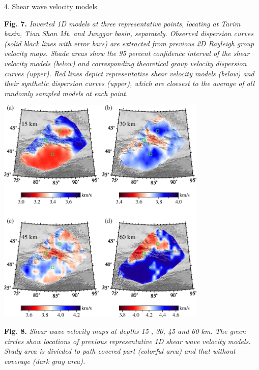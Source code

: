 \documentclass[
    landscape,      %
    paperwidth = 1120mm,
    paperheight = 820mm,
    fontscale = 0.45,
    margin = 1.7cm,
]{baposter}
\begin{document}
\begin{poster}
\begin{posterbox}[column=2 ]{4. Shear wave velocity models}
\begin{center}
\begin{minipage}{0.9\textwidth}
\small
\textbf{Fig. 7.}
\itshape
Inverted 1D models at three representative points, locating at Tarim basin, Tian Shan Mt. and Junggar basin, separately.
Observed dispersion curves (solid black lines with error bars) are extracted from previous 2D Rayleigh group velocity maps.
Shade areas show the 95 percent confidence interval of the shear velocity models (below) and corresponding theoretical
group velocity dispersion curves (upper). Red lines depict representative shear velocity models (below)
and their synthetic dispersion curves (upper), which are cloesest to the average of all randomly sampled models at each point.
\end{minipage}
\end{center}

\begin{center}
\includegraphics[width=0.75\textwidth]{./images/shear_velocity_maps.png}
\begin{minipage}{0.9\textwidth}
\footnotesize
\vspace{0.2em}
\textbf{Fig. 8.}
\itshape
 Shear wave velocity maps at depths 15 , 30, 45 and 60 km. The green circles show locations of previous representative 1D shear wave velocity models.
 Study area is divieded to path covered part (colorful area) and that without coverage (dark gray area).

\end{minipage}
\end{center}


\end{posterbox}
\end{poster}
\end{document}
